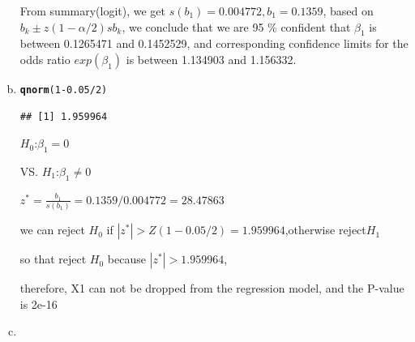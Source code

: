 \documentclass{article}\usepackage[]{graphicx}\usepackage[]{color}
\makeatletter
\newcommand{\hlnum}[1]{\textcolor[rgb]{0.686,0.059,0.569}{#1}}%
\newcommand{\hlopt}[1]{\textcolor[rgb]{0,0,0}{#1}}%
\newcommand{\hlstd}[1]{\textcolor[rgb]{0.345,0.345,0.345}{#1}}%
\newcommand{\hlkwd}[1]{\textcolor[rgb]{0.737,0.353,0.396}{\textbf{#1}}}%
\newenvironment{kframe}{%
 \def\at@end@of@kframe{}%
 \ifinner\ifhmode%
  \def\at@end@of@kframe{\end{minipage}}%
  \begin{minipage}{\columnwidth}%
 \fi\fi%
 \def\FrameCommand##1{\hskip\@totalleftmargin \hskip-\fboxsep
 \colorbox{shadecolor}{##1}\hskip-\fboxsep
     \hskip-\linewidth \hskip-\@totalleftmargin \hskip\columnwidth}%
 \MakeFramed {\advance\hsize-\width
   \@totalleftmargin\z@ \linewidth\hsize
   \@setminipage}}%
 {\par\unskip\endMakeFramed%
 \at@end@of@kframe}
\newenvironment{knitrout}{}{} %
\makeatother
\begin{document}
\begin{enumerate}[(a)]
\qquad From summary(logit), we get $s(b_1) = 0.004772, b_1 = 0.1359$, based on $b_k \pm z(1-\alpha/2)s{b_k}$, we conclude that we are 95 \% confident that $\beta_1$ is between 0.1265471 and 0.1452529, and corresponding confidence limits for the odds ratio $exp(\beta_1)$ is between 1.134903 and 1.156332.

\item

\begin{knitrout}
\color{fgcolor}\begin{kframe}
\begin{alltt}
  \hlkwd{qnorm}\hlstd{(}\hlnum{1}\hlopt{-}\hlnum{0.05}\hlopt{/}\hlnum{2}\hlstd{)}
\end{alltt}
\begin{verbatim}
## [1] 1.959964
\end{verbatim}
\end{kframe}
\end{knitrout}

\begin{center}
$H_0$:$\beta_1=0$

VS. $H_1$:$\beta_1 \ne 0$

$z^*=\frac{b_1}{s(b_1)} = 0.1359/0.004772   = 28.47863$

we can reject $H_0$ if $|z^*| > Z(1-0.05/2)=1.959964$,otherwise reject$H_1$

so that reject $H_0$ because $|z^*|>1.959964$,

therefore, X1 can not be dropped from the regression model, and the P-value is 2e-16
\end{center}

\item


\end{enumerate}
\end{document}

